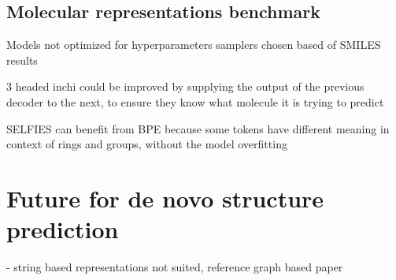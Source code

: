 \subsection{Molecular representations benchmark}

Models not optimized for hyperparameters
samplers chosen based of SMILES results

3 headed inchi could be improved by supplying the output of the previous decoder to the next, to ensure they know what molecule it is trying to predict

SELFIES can benefit from BPE because some tokens have different meaning in context of rings and groups, without the model overfitting

\section{Future for de novo structure prediction}

- string based representations not suited, reference graph based paper
